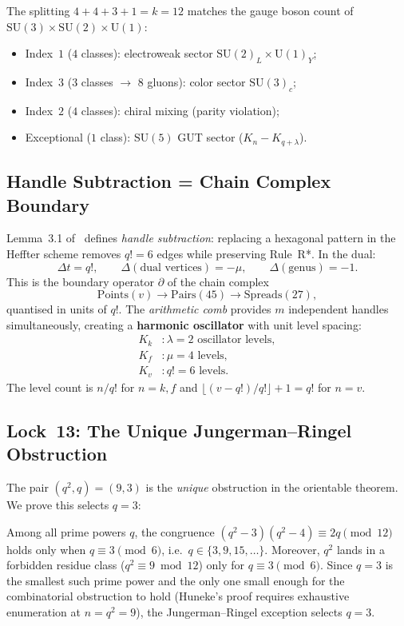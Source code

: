 \noindent
The splitting $4 + 4 + 3 + 1 = k = 12$ matches the gauge boson count of $\mathrm{SU}(3)\times\mathrm{SU}(2)\times\mathrm{U}(1)$:
\begin{itemize}
\item Index~$1$ ($4$ classes): electroweak sector $\mathrm{SU}(2)_L \times \mathrm{U}(1)_Y$;
\item Index~$3$ ($3$ classes $\to$ $8$ gluons): color sector $\mathrm{SU}(3)_c$;
\item Index~$2$ ($4$ classes): chiral mixing (parity violation);
\item Exceptional ($1$ class): $\mathrm{SU}(5)$ GUT sector ($K_n - K_{q+\lambda}$).
\end{itemize}

\subsection{Handle Subtraction = Chain Complex Boundary}

Lemma~3.1 of~\cite{JR1980} defines \emph{handle subtraction}: replacing a hexagonal pattern in the Heffter scheme removes $q! = 6$ edges while preserving Rule~R*.  In the dual:
\[
  \Delta t = q!, \qquad \Delta(\text{dual vertices}) = -\mu, \qquad \Delta(\text{genus}) = -1.
\]
This is the boundary operator $\partial$ of the chain complex
\[
\mathrm{Points}(v) \to \mathrm{Pairs}(45) \to \mathrm{Spreads}(27),
\]
quantised in units of $q!$.
The \emph{arithmetic comb} provides $m$ independent handles simultaneously, creating a \textbf{harmonic oscillator} with unit level spacing:
\begin{align*}
  K_k &\colon \lambda = 2\text{ oscillator levels}, \\
  K_f &\colon \mu = 4\text{ levels}, \\
  K_v &\colon q! = 6\text{ levels}.
\end{align*}
The level count is $n/q!$ for $n = k, f$ and $\lfloor(v-q!)/q!\rfloor + 1 = q!$ for $n = v$.

\subsection{Lock~13: The Unique Jungerman--Ringel Obstruction}

The pair $(q^2, q) = (9, 3)$ is the \emph{unique} obstruction in the orientable theorem.  We prove this selects $q = 3$:

\begin{theorem}[Lock~13]
Among all prime powers $q$, the congruence $(q^2 - 3)(q^2 - 4) \equiv 2q \pmod{12}$ holds only when $q \equiv 3 \pmod{6}$, i.e.\ $q \in \{3, 9, 15, \ldots\}$.  Moreover, $q^2$ lands in a forbidden residue class ($q^2 \equiv 9 \bmod 12$) only for $q \equiv 3 \pmod{6}$.  Since $q = 3$ is the smallest such prime power and the only one small enough for the combinatorial obstruction to hold (Huneke's proof requires exhaustive enumeration at $n = q^2 = 9$), the Jungerman--Ringel exception selects $q = 3$.
\end{theorem}


